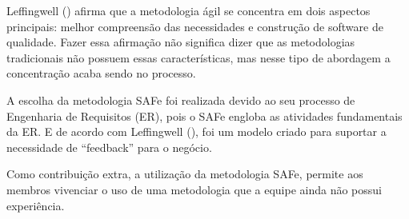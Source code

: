 Leffingwell (\citeyear{safe}) afirma que a metodologia ágil se concentra em dois aspectos principais: melhor compreensão das necessidades e construção de software
de qualidade. Fazer essa afirmação não significa dizer que as metodologias tradicionais não possuem essas características, mas nesse tipo de abordagem
a concentração acaba sendo no processo.

A escolha da metodologia SAFe foi realizada devido ao seu processo de Engenharia de Requisitos (ER), pois o SAFe engloba as atividades
fundamentais da ER. E de acordo com Leffingwell (\citeyear{safe}), foi um modelo criado para suportar a necessidade de ``feedback''
para o negócio. 

Como contribuição extra, a utilização da metodologia SAFe, permite aos membros vivenciar
o uso de uma metodologia que a equipe ainda não possui experiência.
